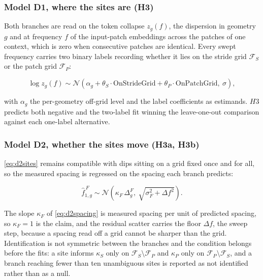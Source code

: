 \subsubsection*{Model D1, where the sites are (H3)}
Both branches are read on the token collapse $z_g(f)$, the dispersion in geometry $g$ and at frequency $f$ of the input-patch embeddings across the patches of one context, which is zero when consecutive patches are identical. Every swept frequency carries two binary labels recording whether it lies on the stride grid $\mathcal{F}_{S}$ or the patch grid $\mathcal{F}_{P}$:

\begin{equation}
\label{eq:d2sites}
\log z_g(f) \sim \mathcal{N}\!\left(
\alpha_g + \theta_S \cdot \text{OnStrideGrid} + \theta_P \cdot \text{OnPatchGrid},\ \sigma
\right),
\end{equation}

with $\alpha_g$ the per-geometry off-grid level and the label coefficients as estimands. $H3$ predicts both negative and the two-label fit winning the leave-one-out comparison against each one-label alternative.





\subsubsection*{Model D2, whether the sites move (H3a, H3b)}
\autoref{eq:d2sites} remains compatible with dips sitting on a grid fixed once and for all, so the measured spacing is regressed on the spacing each branch predicts:

\begin{equation}
\label{eq:d2spacing}
\hat f^{\,F}_{1,g} \sim \mathcal{N}\!\left(
\kappa_F \,\Delta^F_g,\ \sqrt{\sigma_F^2+\Delta f^2}
\right).
\end{equation}

The slope $\kappa_F$ of \autoref{eq:d2spacing} is measured spacing per unit of predicted spacing, so $\kappa_F=1$ is the claim, and the residual scatter carries the floor $\Delta f$, the sweep step, because a spacing read off a grid cannot be sharper than the grid. Identification is not symmetric between the branches and the condition belongs before the fits: a site informs $\kappa_S$ only on $\mathcal F_S \setminus \mathcal F_P$ and $\kappa_P$ only on $\mathcal F_P \setminus \mathcal F_S$, and a branch reaching fewer than ten unambiguous sites is reported as not identified rather than as a null.



